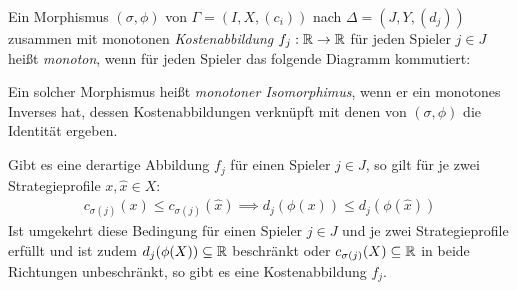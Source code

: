 \begin{defn}
	Ein Morphismus $(\sigma, \phi)$ von $\Gamma = (I, X, (c_i))$ nach $\Delta = (J, Y, (d_j))$ zusammen mit monotonen \emph{Kostenabbildung} $f_j: \mathbb{R} \to \mathbb{R}$ für jeden Spieler $j \in J$ heißt \emph{monoton}, wenn für jeden Spieler das folgende Diagramm kommutiert:	
	\begin{center}
	\end{center}
	Ein solcher Morphismus heißt \emph{monotoner Isomorphimus}, wenn er ein monotones Inverses hat, dessen Kostenabbildungen verknüpft mit denen von $(\sigma, \phi)$ die Identität ergeben.
\end{defn}

\begin{bem}
	Gibt es eine derartige Abbildung $f_j$ für einen Spieler $j \in J$, so gilt für je zwei Strategieprofile $x, \hat{x} \in X$:
		\begin{align}\label{eq:CharExMonMor}
			c_{\sigma(j)}(x) \leq c_{\sigma(j)}(\hat{x}) \implies d_j(\phi(x)) \leq d_j(\phi(\hat{x}))
		\end{align}
	Ist umgekehrt diese Bedingung für einen Spieler $j \in J$ und je zwei Strategieprofile erfüllt und ist zudem $d_j(\phi(X)) \subseteq \mathbb{R}$ beschränkt oder $c_{\sigma(j)}(X) \subseteq \mathbb{R}$ in beide Richtungen unbeschränkt, so gibt es eine Kostenabbildung $f_j$.
\end{bem}

